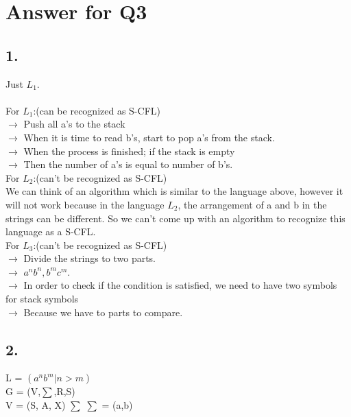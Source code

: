 \documentclass[12pt]{article}
\begin{document}
\section*{Answer for Q3}

\subsection*{1.} 

Just $L_1$.\\
\\
For $L_1$:(can be recognized as S-CFL)\\


		$\rightarrow$ Push all a's to the stack\\
		$\rightarrow$ When it is time to read b's, start to pop a's from the stack.\\
		$\rightarrow$ When the process is finished; if the stack is empty\\
		$\rightarrow$ Then the number of a's is equal to number of b's.\\


For $L_2$:(can't be recognized as S-CFL)\\

We can think of an algorithm which is similar to the language above, however it will not work because in the language $L_2$, the arrangement of a and b in the strings can be different. So we can't come up with an algorithm to recognize this language as a S-CFL.\\

For $L_3$:(can't be recognized as S-CFL)\\

		$\rightarrow$ Divide the strings to two parts.\\
		$\rightarrow$ $a^n b^n, b^m c^m$.\\
		$\rightarrow$ In order to check if the condition is satisfied, we need to have two symbols for stack symbols\\
		$\rightarrow$ Because we have to parts to compare.\\

\subsection*{2.} 

L = $(a^n b^m | n > m)$\\
G = (V,$\sum$,R,S)\\
V = (S, A, X) $\sum$
$\sum$ = (a,b)\\
\end{document}
